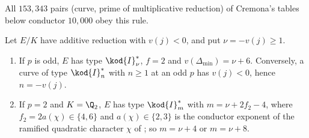 All $153{,}343$ pairs (curve, prime of multiplicative reduction) of Cremona's tables below conductor $10{,}000$ obey this rule.

\begin{theorem}\label{thm:reduction:potmult-additive}
Let $E/K$ have additive reduction with $v(j)<0$, and put $\nu=-v(j)\ge1$.
\begin{enumerate}[label=(\roman*)]
\item If $p$ is odd, $E$ has type $\kod{I}_\nu^*$, $f=2$ and $v(\Delta_{\min})=\nu+6$. Conversely, a curve of type $\kod{I}_n^*$ with $n\ge1$ at an
odd $p$ has $v(j)<0$, hence $n=-v(j)$.
\item If $p=2$ and $K=\Q_2$, $E$ has type $\kod{I}_m^*$ with $m=\nu+2f_2-4$, where $f_2=2a(\chi)\in\{4,6\}$ and $a(\chi)\in\{2,3\}$ is the conductor
exponent of the ramified quadratic character $\chi$ of ; so $m=\nu+4$ or $m=\nu+8$.
\end{enumerate}
\end{theorem}

